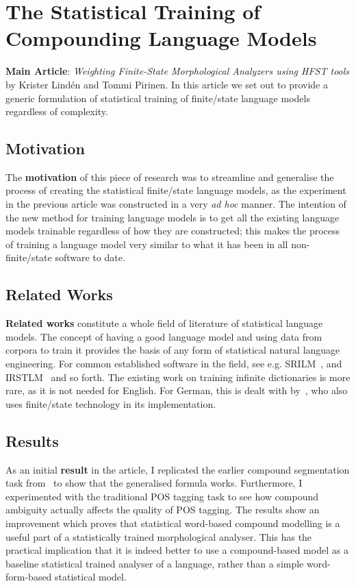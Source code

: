 \documentclass[officiallayout,final]{unihelcompling}
\begin{document}
\section{The Statistical Training of Compounding Language Models}
\label{sec:training-compounds}

\textbf{Main Article}: \emph{Weighting Finite-State Morphological Analyzers
using HFST tools} by Krister Lindén and Tommi Pirinen. In this article we set out
to provide a generic formulation of statistical training of finite\-/state
language models regardless of complexity.

\subsection{Motivation}

The \textbf{motivation} of this piece of research was to streamline and
generalise the process of creating the statistical finite\-/state language
models, as the experiment in the previous article
 was constructed in a very \emph{ad hoc}
manner. The intention of the new method for training language models is to get
all the existing language models trainable regardless of how they are
constructed; this makes the process of training a language model very similar
to what it has been in all non-finite\-/state software to date.

\subsection{Related Works}

\textbf{Related works} constitute a whole field of literature of statistical
language models. The concept of having a good language model and using data
from corpora to train it provides the basis of any form of statistical natural
language engineering. For common established software in the field, see e.g.
SRILM~\citep{stolcke2002srilm}, and IRSTLM~\citep{federico2008irstlm} and so
forth.  The existing work on training infinite dictionaries is more rare, as it
is not needed for English. For German, this is dealt with
by~\citet{schiller2006german}, who also uses finite\-/state technology in its
implementation.

\subsection{Results}

As an initial \textbf{result} in the article, I replicated the earlier compound
segmentation task from~ to show that the generalised formula works.
Furthermore, I experimented with the traditional POS tagging task to see how
compound ambiguity actually affects the quality of POS tagging. The results
show an improvement which proves that statistical word-based compound
modelling is a useful part of a statistically trained morphological
analyser. This has the practical implication that it is indeed better to
use a compound-based model as a baseline statistical trained analyser
of a language, rather than a simple word-form-based statistical model.
\end{document}
